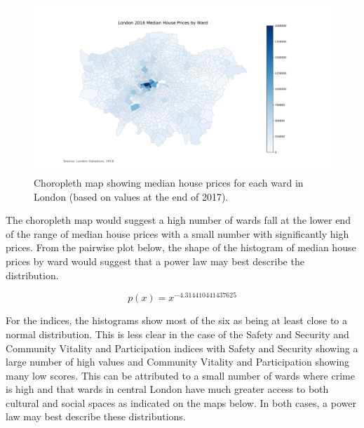 \begin{figure}[H]
\centering
\includegraphics[scale=0.4]{figures/HPMedian}
\decoRule
\caption{Choropleth map showing median house prices for each ward in London (based on values at the end of 2017).}
\end{figure}

The choropleth map would suggest a high number of wards fall at the lower end of the range of median house prices with a small number with significantly high prices. From the pairwise plot below, the shape of the histogram of median house prices by ward would suggest that a power law may best describe the distribution.

\begin{equation}
p(x) = x^{-4.314410441437625}
\label{eqn:Einstein}
\end{equation}

For the indices, the histograms show most of the six as being at least close to a normal distribution. This is less clear in the case of the Safety and Security and Community Vitality and Participation indices with Safety and Security showing a large number of high values and Community Vitality and Participation showing many low scores. This can be attributed to a small number of wards where crime is high and that wards in central London have much greater access to both cultural and social spaces as indicated on the maps below. In both cases, a power law may best describe these distributions.

